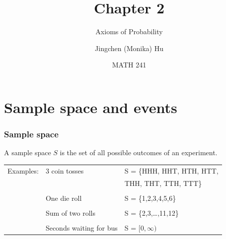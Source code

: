 \documentclass[slidestop,compress,mathserif]{beamer}
\title[Chapter 2]{Chapter 2}
\subtitle{Axioms of Probability}
\author[Jingchen (Monika) Hu]
{Jingchen (Monika) Hu}
\institute[Vassar]
{Vassar College}
\date[MATH 241]
{MATH 241}
\begin{document}


\begin{frame}%
\titlepage
\end{frame}

%
%
%
%
%




\section{Sample space and events}
\begin{frame}\frametitle{Sample space}

\begin{defn}
A sample space $S$ is the set of all possible outcomes
of an experiment.
\end{defn}

\vspace{.1in}

\begin{tabular}{lll}
Examples:	& 3 coin tosses  				& S = \{HHH, HHT, HTH, HTT,						\\
			&			  				& 					THH, THT, TTH, TTT\}	\\
			&&\\
                    	& One die roll	   				& S = \{1,2,3,4,5,6\}								\\
			&&\\
                    	& Sum of two rolls      			& S = \{2,3,\ldots,11,12\}							\\
			&&\\
                    	& Seconds waiting for bus  		& S = $[0,\infty)$								\\
\end{tabular}


\end{frame}
\end{document}
